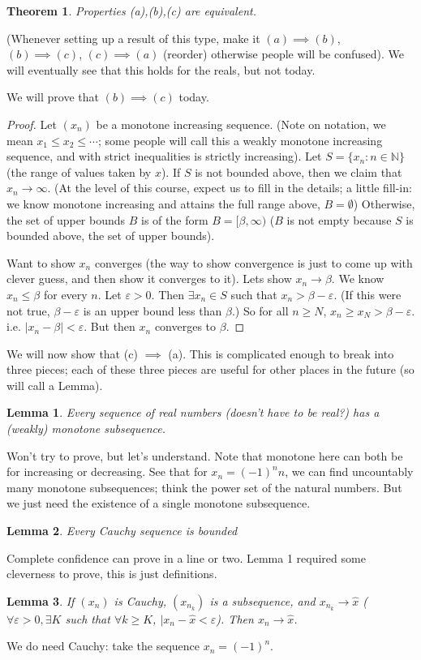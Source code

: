 \documentclass{article}
\theoremstyle{plain}
\newtheorem{theorem}{Theorem}
\newtheorem{lemma}{Lemma}
\theoremstyle{remark}
\newcommand{\N}{{\mathbb N}}
\newcommand{\ep}{{\varepsilon}}
\begin{document}
\begin{theorem}
	Properties (a),(b),(c) are equivalent.
\end{theorem}
(Whenever setting up a result of this type,
make it $(a) \implies (b)$, $(b) \implies (c)$, $(c) \implies (a)$
(reorder) otherwise people will be confused).
We will eventually see that this holds for the reals, but not today.

We will prove that $(b) \implies (c)$ today.
\begin{proof}
	Let $(x_n)$ be a monotone increasing sequence.
	(Note on notation, we mean $x_1 \leq x_2 \leq \cdots$;
	some people will call this a weakly monotone increasing sequence,
	and with strict inequalities is strictly increasing).
	Let $S = \{x_n \colon n \in \N\}$ (the range of values taken by $x$).
	If $S$ is not bounded above,
	then we claim that $x_n \to \infty$.
	(At the level of this course,
	expect us to fill in the details;
	a little fill-in: we know monotone increasing and attains
	the full range above, $B = \emptyset$)
	Otherwise, the set of upper bounds $B$ is of the form
	$B = [\beta,\infty)$
	($B$ is not empty because $S$ is bounded above, the set of upper bounds).

	Want to show $x_n$ converges
	(the way to show convergence is just to come up with clever guess,
	and then show it converges to it).
	Lets show $x_n \to \beta$.
	We know $x_n \leq \beta$ for every $n$.
	Let $\ep>0$. Then $\exists x_n \in S$ such that $x_n > \beta - \ep$.
	(If this were not true, $\beta - \ep$ is an upper bound less than $\beta$.)
	So for all $n \geq N$, $x_n \geq x_N > \beta - \ep$.
	i.e. $|x_n - \beta| < \ep$.
	But then $x_n$ converges to $\beta$.
\end{proof}

We will now show that (c) $\implies$ (a).
This is complicated enough to break into three pieces;
each of these three pieces are useful for other places in the future
(so will call a Lemma).
\begin{lemma}
	Every sequence of real numbers (doesn't have to be real?)
	has a (weakly) monotone subsequence.
\end{lemma}
Won't try to prove, but let's understand.
Note that monotone here can both be for increasing or decreasing.
See that for $x_n = (-1)^nn$, we can find uncountably many monotone subsequences;
think the power set of the natural numbers.
But we just need the existence of a single monotone subsequence.
\begin{lemma}
	Every Cauchy sequence is bounded
\end{lemma}
Complete confidence can prove in a line or two.
Lemma 1 required some cleverness to prove, this is just definitions.
\begin{lemma}
	If $(x_n)$ is Cauchy, $(x_{n_k})$ is a subsequence,
	and $x_{n_k} \to \hat{x}$
	($\forall \ep > 0, \exists K$ such that $\forall k \geq K$, $|x_n-\hat{x} < \ep$).
	Then $x_n \to \hat{x}$.
\end{lemma}
We do need Cauchy: take the sequence $x_n = (-1)^n$.
\end{document}
